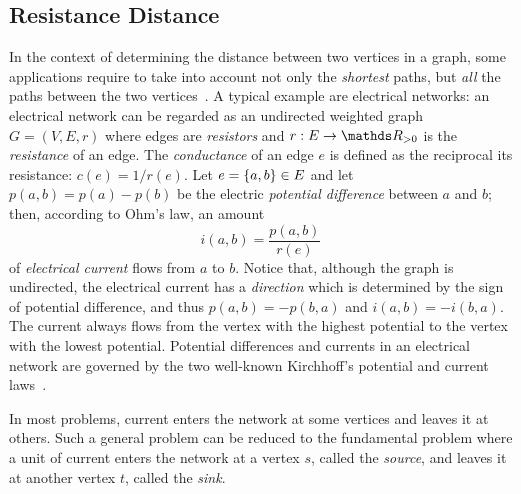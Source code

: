 %
\subsection{Resistance Distance}
\label{sec:prelim-resistance-distance}
%
In the context of determining the distance between two vertices in a graph,
some applications require to take into account not only the \emph{shortest} paths,
but \emph{all} the paths between the two
vertices~\cite{DBLP:journals/socnet/Borgatti05,
DBLP:journals/corr/abs-math-0602073,stephenson1989rethinking}.
A typical example are
electrical networks: an electrical network can be
regarded as an undirected weighted graph $G = (V, E, r)$ where
edges are \emph{resistors} and $r : E \to \real_{> 0}$ is the
\emph{resistance} of an edge. The \emph{conductance} of an edge $e$
is defined as the reciprocal its resistance: $c(e) = 1/r(e)$.
Let $e = \set{a, b}\in E$ and let $p(a,b) = p(a) - p(b)$ be the
electric \emph{potential difference} between $a$ and $b$; then, according to
Ohm's law, an amount
%
\[i(a,b) = \frac{p(a,b)}{r(e)}\]
%
of \emph{electrical current} flows from $a$ to $b$.
Notice that, although the graph is undirected,  the electrical current has a
\emph{direction} which is determined by the sign of potential difference, and thus
$p(a,b) = -p(b,a)$ and $i(a,b) = -i(b,a)$. The current always flows from
the vertex with the highest potential to the vertex with the lowest potential.
Potential differences and currents in an electrical network are governed by the
two well-known Kirchhoff's potential and current
laws~\cite{DBLP:books/daglib/0009415,DBLP:conf/lcn/LuoWCC05}.



In most problems, current enters the network at some vertices
and leaves it at others. Such a general problem can be reduced to the
fundamental problem where a unit of current enters the network at a
vertex $s$, called the \emph{source}, and leaves it at another vertex $t$,
called the \emph{sink}.

